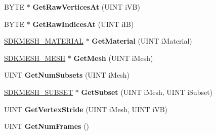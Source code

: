 \begin{DoxyCompactItemize}
\item 
\hypertarget{class_c_d_x_u_t_s_d_k_mesh_a1e390cea4c5cb370ec07a73a4ec461cd}{B\+Y\+T\+E $\ast$ {\bfseries Get\+Raw\+Vertices\+At} (U\+I\+N\+T i\+V\+B)}\label{class_c_d_x_u_t_s_d_k_mesh_a1e390cea4c5cb370ec07a73a4ec461cd}

\item 
\hypertarget{class_c_d_x_u_t_s_d_k_mesh_a00145ae0021e7a080f3ef0801043fb4d}{B\+Y\+T\+E $\ast$ {\bfseries Get\+Raw\+Indices\+At} (U\+I\+N\+T i\+I\+B)}\label{class_c_d_x_u_t_s_d_k_mesh_a00145ae0021e7a080f3ef0801043fb4d}

\item 
\hypertarget{class_c_d_x_u_t_s_d_k_mesh_a58cbb3d42af235b3b3f65912b1469b86}{\hyperlink{struct_s_d_k_m_e_s_h___m_a_t_e_r_i_a_l}{S\+D\+K\+M\+E\+S\+H\+\_\+\+M\+A\+T\+E\+R\+I\+A\+L} $\ast$ {\bfseries Get\+Material} (U\+I\+N\+T i\+Material)}\label{class_c_d_x_u_t_s_d_k_mesh_a58cbb3d42af235b3b3f65912b1469b86}

\item 
\hypertarget{class_c_d_x_u_t_s_d_k_mesh_aa05df25d3dcf4f1a25c8a088ae90dcb0}{\hyperlink{struct_s_d_k_m_e_s_h___m_e_s_h}{S\+D\+K\+M\+E\+S\+H\+\_\+\+M\+E\+S\+H} $\ast$ {\bfseries Get\+Mesh} (U\+I\+N\+T i\+Mesh)}\label{class_c_d_x_u_t_s_d_k_mesh_aa05df25d3dcf4f1a25c8a088ae90dcb0}

\item 
\hypertarget{class_c_d_x_u_t_s_d_k_mesh_ac5dac5f2c342a542661df0c694b1410d}{U\+I\+N\+T {\bfseries Get\+Num\+Subsets} (U\+I\+N\+T i\+Mesh)}\label{class_c_d_x_u_t_s_d_k_mesh_ac5dac5f2c342a542661df0c694b1410d}

\item 
\hypertarget{class_c_d_x_u_t_s_d_k_mesh_a9bd93fcdfc93c7996ea26cc3369cd2ae}{\hyperlink{struct_s_d_k_m_e_s_h___s_u_b_s_e_t}{S\+D\+K\+M\+E\+S\+H\+\_\+\+S\+U\+B\+S\+E\+T} $\ast$ {\bfseries Get\+Subset} (U\+I\+N\+T i\+Mesh, U\+I\+N\+T i\+Subset)}\label{class_c_d_x_u_t_s_d_k_mesh_a9bd93fcdfc93c7996ea26cc3369cd2ae}

\item 
\hypertarget{class_c_d_x_u_t_s_d_k_mesh_a39c88859404f294f8eda0fffc1d41407}{U\+I\+N\+T {\bfseries Get\+Vertex\+Stride} (U\+I\+N\+T i\+Mesh, U\+I\+N\+T i\+V\+B)}\label{class_c_d_x_u_t_s_d_k_mesh_a39c88859404f294f8eda0fffc1d41407}

\item 
\hypertarget{class_c_d_x_u_t_s_d_k_mesh_a2329777b2cbc7eb2e9e4d1d529e31e83}{U\+I\+N\+T {\bfseries Get\+Num\+Frames} ()}\label{class_c_d_x_u_t_s_d_k_mesh_a2329777b2cbc7eb2e9e4d1d529e31e83}


\end{DoxyCompactItemize}
